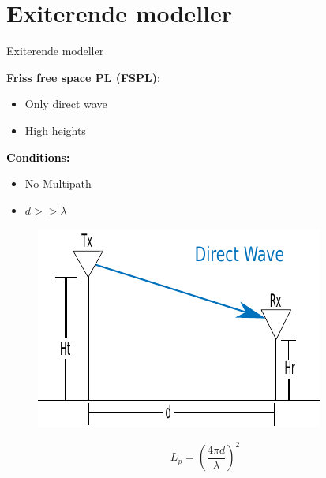 \section{Exiterende modeller}
\begin{frame}{Exiterende modeller}
\begin{minipage}{.45\textwidth}
\raggedright\textcolor{thomasblue}{\textbf{Friss free space PL (FSPL)}:}
\begin{itemize}
\item Only direct wave
\item High heights
\end{itemize} 

\vspace{1em}
\textcolor{black}{\textbf{Conditions:}}
\begin{itemize}
\item No Multipath
\item $d >> \lambda$
\end{itemize}
\end{minipage}
\begin{minipage}{0.5\textwidth}

\begin{figure}[!htbp]
 \centering
  \includegraphics[width = \columnwidth]{figures/friss_illu.pdf}
  \end{figure}
\end{minipage}

\vspace{1em}
\begin{equation*}
L_p=\left(\frac{4 \pi d}{\lambda}\right)^2
\end{equation*}
\end{frame}


